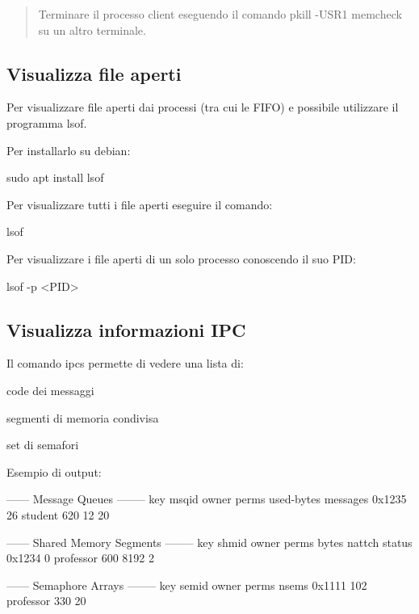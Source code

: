 \begin{quote}
Terminare il processo client eseguendo il comando {\ttfamily pkill -\/\+U\+S\+R1 memcheck} su un altro terminale. \end{quote}


\subsection*{Visualizza file aperti}

Per visualizzare file aperti dai processi (tra cui le F\+I\+FO) e\textquotesingle{} possibile utilizzare il programma {\ttfamily lsof}.

Per installarlo su debian\+: 
\begin{DoxyCode}
sudo apt install lsof
\end{DoxyCode}


Per visualizzare tutti i file aperti eseguire il comando\+: 
\begin{DoxyCode}
lsof
\end{DoxyCode}


Per visualizzare i file aperti di un solo processo conoscendo il suo P\+ID\+: 
\begin{DoxyCode}
lsof -p <PID>
\end{DoxyCode}


\subsection*{Visualizza informazioni I\+PC}

Il comando {\ttfamily ipcs} permette di vedere una lista di\+:
\begin{DoxyItemize}
\item code dei messaggi
\item segmenti di memoria condivisa
\item set di semafori
\end{DoxyItemize}

Esempio di output\+: 
\begin{DoxyCode}
------ Message Queues --------
key     msqid  owner    perms  used-bytes  messages
0x1235  26     student  620    12          20

------ Shared Memory Segments --------
key     shmid  owner      perms  bytes  nattch  status
0x1234  0      professor  600    8192   2

------ Semaphore Arrays --------
key     semid  owner      perms  nsems
0x1111  102    professor  330    20
\end{DoxyCode}


